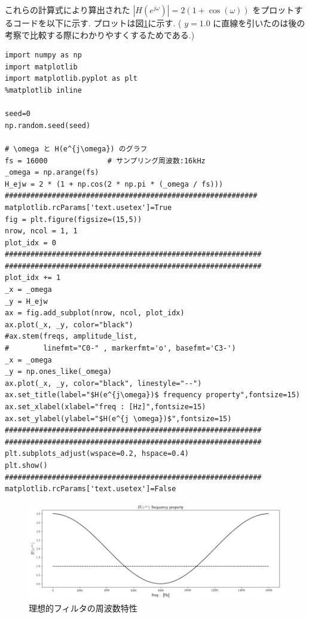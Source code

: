 \documentclass[12pt]{jsarticle}
\begin{document}
        これらの計算式により算出された $| H(e^{j \omega}) | = 2 (1 + \cos (\omega))$ をプロットするコードを以下に示す.
        プロットは図\ref{img-frequency_property_of_an_ideal_filter}に示す.
				( $y=1.0$ に直線を引いたのは後の考察で比較する際にわかりやすくするためである.)
        \begin{lstlisting}[basicstyle=\ttfamily\footnotesize, frame=single]
import numpy as np
import matplotlib
import matplotlib.pyplot as plt
%matplotlib inline

seed=0
np.random.seed(seed)

# \omega と H(e^{j\omega}) のグラフ
fs = 16000              # サンプリング周波数:16kHz
_omega = np.arange(fs)
H_ejw = 2 * (1 + np.cos(2 * np.pi * (_omega / fs)))
###########################################################
matplotlib.rcParams['text.usetex']=True
fig = plt.figure(figsize=(15,5))
nrow, ncol = 1, 1
plot_idx = 0
############################################################
############################################################
plot_idx += 1
_x = _omega
_y = H_ejw
ax = fig.add_subplot(nrow, ncol, plot_idx)
ax.plot(_x, _y, color="black")
#ax.stem(freqs, amplitude_list,
#        linefmt="C0-" , markerfmt='o', basefmt='C3-')
_x = _omega
_y = np.ones_like(_omega)
ax.plot(_x, _y, color="black", linestyle="--")
ax.set_title(label="$H(e^{j\omega})$ frequency property",fontsize=15)
ax.set_xlabel(xlabel="freq : [Hz]",fontsize=15)
ax.set_ylabel(ylabel="$H(e^{j \omega})$",fontsize=15)
############################################################
############################################################
plt.subplots_adjust(wspace=0.2, hspace=0.4)
plt.show()
############################################################
matplotlib.rcParams['text.usetex']=False
				\end{lstlisting}
				
    		\begin{figure}[H]
    			\begin{center}
    				\includegraphics[width=1.0\columnwidth]{img/frequency_property_of_an_ideal_filter.png}
    				\caption{理想的フィルタの周波数特性}
    				\label{img-frequency_property_of_an_ideal_filter}
    			\end{center}
    		\end{figure}
    		
\end{document}
